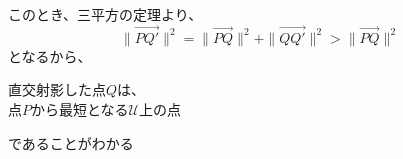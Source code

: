 \documentclass[../../../topic_linear-algebra]{subfiles}
\begin{document}
このとき、三平方の定理より、
\begin{equation*}
  \| \overrightarrow{PQ'} \|^2 = \| \overrightarrow{PQ} \|^2 + \| \overrightarrow{QQ'} \|^2 > \| \overrightarrow{PQ} \|^2
\end{equation*}
となるから、
\begin{emphabox}
  \begin{spacebox}
    \begin{center}
      直交射影した点$Q$は、\\
      点$P$から最短となる$\mathcal{U}$上の点
    \end{center}
  \end{spacebox}
\end{emphabox}
であることがわかる
\end{document}
